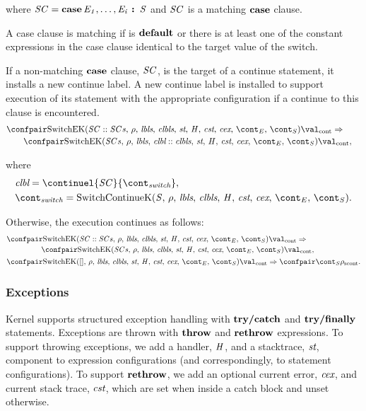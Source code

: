 \documentclass[a4paper,oneside]{article}
\newcommand{\synt}[1]{\ensuremath{\text{\textbf{#1}}}}
\DeclareMathOperator{\throw}{\synt{throw}}
\DeclareMathOperator{\rethrow}{\synt{rethrow}}
\DeclareMathOperator{\case}{\synt{case}}
\DeclareMathOperator{\default}{\synt{default}}
\newcommand{\cesktrans}[2]{\ensuremath{{#1} \Rightarrow {#2}}}
\newcommand{\cesktranssplit}[2]{\ensuremath{{#1} \Rightarrow\\ {#2}}}
\begin{document}
\noindent where $\scase = \case \expri{1}, \dots, \expri{i} \synt{ : } \stmt$ and $\mathit{SC}$ is a matching $\case$ clause.

A case clause is matching if is $\default$ or there is at least one of the constant expressions in the case clause identical to the target value of the switch.

If a non-matching $\case$ clause, $\mathit{SC}$, is the target of a continue statement, it installs a new continue label.
A new continue label is installed to support execution of its statement with the appropriate configuration if a continue to this clause is encountered.
\begin{align*}
    &\begin{multlined}
        \cesktranssplit
            {\contconf{\SwitchK{\scase :: \scases}{\clbls}}{\val}}%
            {\contconf{\SwitchK{\scases}{\clbl :: \clbls}}{\val}},
    \end{multlined}
\end{align*}

\noindent where
\begin{align*}
    &\clbl = \continuel{\scase}{\switchcont},\\
    &\switchcont = \ContinueK.
\end{align*}

Otherwise, the execution continues as follows:
\begin{align*}
    &\begin{multlined}
        \cesktranssplit%
            {\contconf{\SwitchK{\scase :: \scases}{\clbls}}{\val}}%
            {\contconf{\SwitchK{\scases}{\clbls}}{\val}},
    \end{multlined}\\
    &\cesktrans%
        {\contconf{\SwitchK{[]}{\clbls}}{\val}}%
        {\scontconf{\scont}{\env}}.
\end{align*}


\subsubsection{Exceptions}

Kernel supports structured exception handling with $\synt{try/catch}$ and $\synt{try/finally}$ statements.
Exceptions are thrown with $\throw$ and $\rethrow$ expressions.
To support throwing exceptions, we add a handler, $\mathit{H}$, and a stacktrace, $\textit{st}$, component to expression configurations (and correspondingly, to statement configurations).
To support $\rethrow$, we add an optional current error, $\textit{cex}$, and current stack trace, $\textit{cst}$, which are set when inside a catch block and unset otherwise.
\end{document}
